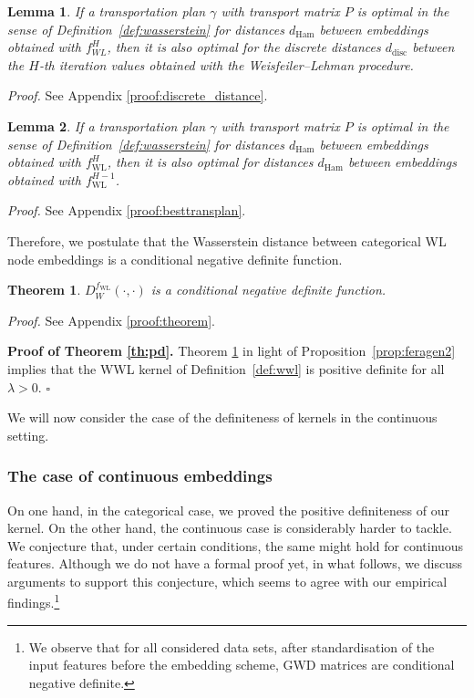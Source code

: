 \documentclass{article}
\newtheorem{theorem}{Theorem}
\newtheorem{lemma}{Lemma}\newtheorem{conjecture}{Conjecture}
\begin{document}
\begin{lemma}
\label{lemma:discrete_distance}
If a transportation plan $\gamma$ with transport matrix $P$ is optimal in the sense of Definition~\ref{def:wasserstein} for distances $d_{\mathrm{Ham}}$ between embeddings obtained with $f^{H}_{\scriptscriptstyle{WL}}$, then it is also optimal for the discrete distances $d_{\mathrm{disc}}$ between the $H$-th iteration values obtained with the Weisfeiler--Lehman procedure.
\end{lemma}
\textit{Proof.} See Appendix \ref{proof:discrete_distance}.

\begin{lemma}
\label{lemma:besttransplan}
  If a transportation plan $\gamma$ with transport matrix $P$ is optimal in the sense of Definition~\ref{def:wasserstein} for distances $d_{\mathrm{Ham}}$ between embeddings obtained with $f^{H}_{\mathrm{\scriptscriptstyle{WL}}}$, then it is also optimal for distances $d_{\mathrm{Ham}}$ between embeddings obtained with $f^{H-1}_{\mathrm{\scriptscriptstyle{WL}}}$.
\end{lemma}
\textit{Proof.} See Appendix \ref{proof:besttransplan}.

Therefore, we postulate that the Wasserstein distance between categorical WL node embeddings is a conditional negative definite function.
\begin{theorem} 
\label{th:neg}
$D^{f_{\mathrm{\scriptscriptstyle{WL}}}}_W(\cdot,\cdot)$ is a conditional negative definite function.
\end{theorem}
\textit{Proof.} See Appendix \ref{proof:theorem}.

\textbf{Proof of Theorem \ref{th:pd}.}
Theorem \ref{th:neg} in light of Proposition~\ref{prop:feragen2} implies that the WWL kernel of Definition~\ref{def:wwl} is positive definite for all $\lambda > 0$. \hfill $\square$

We will now consider the case of the definiteness of kernels in the continuous setting. 

\subsubsection{The case of continuous embeddings}\label{sec:Continuous embeddings}

On one hand, in the categorical case, we proved the positive definiteness of our kernel. On the other hand, the continuous case is considerably harder to tackle.
We conjecture that, under certain conditions, the same might hold for continuous features. 
Although we do not have a formal proof yet, in what follows, we discuss arguments to support this conjecture, which seems to agree with our empirical findings.\footnote{We observe that for all considered data sets, after standardisation of the input features before the embedding scheme, GWD matrices are conditional negative definite.}
\end{document}
